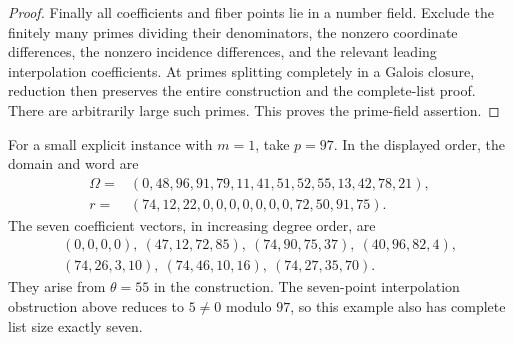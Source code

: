 \begin{proof}
Finally all coefficients and fiber points lie in a number field.
Exclude the finitely many primes dividing their denominators, the
nonzero coordinate differences, the nonzero incidence differences,
and the relevant leading interpolation coefficients.  At primes
splitting completely in a Galois closure, reduction then preserves the
entire construction and the complete-list proof.  There are arbitrarily
large such primes.  This proves the prime-field assertion.
\end{proof}

For a small explicit instance with $m=1$, take $p=97$.  In the displayed
order, the domain and word are
\[
\begin{split}
 \Omega={}&(0,48,96,91,79,11,41,51,52,55,13,42,78,21),\\
 r={}&(74,12,22,0,0,0,0,0,0,0,72,50,91,75).
\end{split}
\]
The seven coefficient vectors, in increasing degree order, are
\[
\begin{gathered}
 (0,0,0,0),\ (47,12,72,85),\ (74,90,75,37),\
 (40,96,82,4),\\
 (74,26,3,10),\ (74,46,10,16),\ (74,27,35,70).
\end{gathered}
\]
They arise from $\theta=55$ in the construction.  The seven-point
interpolation obstruction above reduces to $5\ne0$ modulo $97$, so this
example also has complete list size exactly seven.
